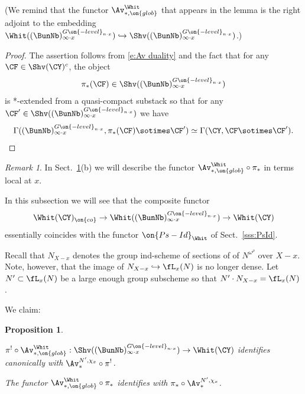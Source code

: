 \documentclass[9pt]{amsart}
\newtheorem{prop}[subsubsection]{Proposition}
\theoremstyle{definition}
\theoremstyle{remark}
\newtheorem{rem}[subsubsection]{Remark}
\newcommand{\secref}[1]{Sect.~\ref{#1}}
\numberwithin{equation}{section}
\begin{document}
(We remind that the functor $\Av_{*,\on{glob}}^{\Whit}$ that appears in the lemma is the right adjoint to the embedding
$\Whit((\BunNb)^{G\on{-level}_{n\cdot x}}_{\infty\cdot x})\hookrightarrow \Shv((\BunNb)^{G\on{-level}_{n\cdot x}}_{\infty\cdot x})$.) 

\begin{proof}

The assertion follows from \eqref{e:Av duality} and the fact that for any $\CF\in \Shv(\CY)^c$, the object 
$$\pi_*(\CF)\in \Shv((\BunNb)^{G\on{-level}_{n\cdot x}}_{\infty\cdot x})$$ is *-extended from a quasi-compact
substack so that for any $\CF'\in \Shv((\BunNb)^{G\on{-level}_{n\cdot x}}_{\infty\cdot x})$ we have
$$\Gamma((\BunNb)^{G\on{-level}_{n\cdot x}}_{\infty\cdot x},\pi_*(\CF)\sotimes \CF')\simeq
\Gamma(\CY,\CF\sotimes \CF').$$

\end{proof}

\begin{rem}
In \secref{p:averagings}(b) we will describe the functor $\Av_{*,\on{glob}}^{\Whit}\circ \pi_*$ in terms local at $x$.
\end{rem}


In this subsection we will see that the composite functor
$$\Whit(\CY)_{\on{co}}\to \Whit((\BunNb)^{G\on{-level}_{n\cdot x}}_{\infty\cdot x})\to \Whit(\CY)$$
essentially coincides with the functor $\on{Ps-Id}_{\Whit}$ of \secref{sss:PsId}. 

\sssec{}

Recall that $N_{X-x}$ denotes the group ind-scheme of sections of of $N^{\omega^\rho}$ over $X-x$. Note, however,
that the image of $N_{X-x}\hookrightarrow \fL_x(N)$ is no longer dense. 
Let $N'\subset \fL_x(N)$ be a large enough group subscheme so that $N'\cdot N_{X-x}=\fL_x(N)$.

\medskip

We claim:

\begin{prop}  \hfill  \label{p:averagings}

\smallskip

 $\pi^!\circ \Av_{*,\on{glob}}^{\Whit}: \Shv((\BunNb)^{G\on{-level}_{n\cdot x}}_{\infty\cdot x})\to
\Whit(\CY)$ identifies canonically with $\Av^{N',\chi_x}_*\circ \pi^!$.

\smallskip

 The functor $\Av_{*,\on{glob}}^{\Whit}\circ \pi_*$ identifies with $\pi_*\circ \Av^{N',\chi_x}_*$. 
\end{prop}
\end{document}
